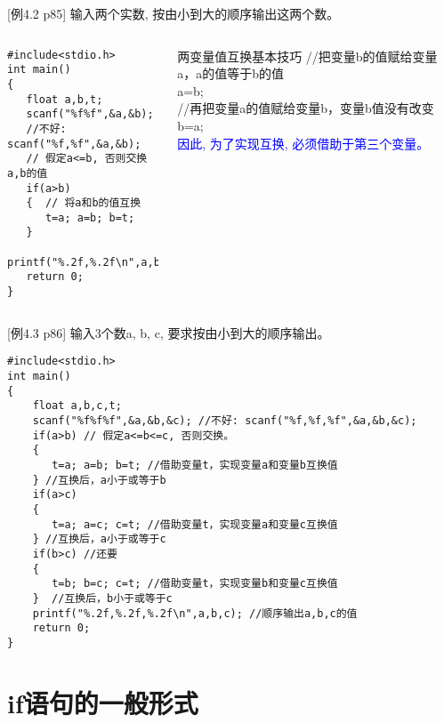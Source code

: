 \begin{frame}{\small [例4.2 p85] 输入两个实数, 按由小到大的顺序输出这两个数。}
\vspace{-0.4cm}
\begin{columns}
\begin{lstlisting}
#include<stdio.h>        
int main()                   
{  
   float a,b,t;
   scanf("%f%f",&a,&b); 
   //不好: scanf("%f,%f",&a,&b);
   // 假定a<=b, 否则交换a,b的值
   if(a>b)
   {  // 将a和b的值互换
      t=a; a=b; b=t;
   }
   printf("%.2f,%.2f\n",a,b);
   return 0;           
}
\end{lstlisting} 
\small
\begin{block}{两变量值互换基本技巧}
//把变量b的值赋给变量a，a的值等于b的值\\
a=b;  \\
//再把变量a的值赋给变量b，变量b值没有改变
b=a;  \\
\textcolor{blue}{因此, 为了实现互换, 必须借助于第三个变量。}
\end{block}
\end{columns}                           
\end{frame}

\begin{frame}{\small [例4.3 p86] 输入3个数a, b, c, 要求按由小到大的顺序输出。}
\vspace*{-0.4cm}
\begin{lstlisting}
#include<stdio.h>        
int main()                   
{  
    float a,b,c,t;
    scanf("%f%f%f",&a,&b,&c); //不好: scanf("%f,%f,%f",&a,&b,&c);
    if(a>b) // 假定a<=b<=c, 否则交换。
    {
       t=a; a=b; b=t; //借助变量t，实现变量a和变量b互换值
    } //互换后，a小于或等于b     
    if(a>c)
    {
       t=a; a=c; c=t; //借助变量t，实现变量a和变量c互换值
    } //互换后，a小于或等于c       
    if(b>c) //还要
    { 
       t=b; b=c; c=t; //借助变量t，实现变量b和变量c互换值
    }  //互换后，b小于或等于c                       
    printf("%.2f,%.2f,%.2f\n",a,b,c); //顺序输出a,b,c的值
    return 0;  
}
\end{lstlisting}                   
\end{frame}

\section{if语句的一般形式}

